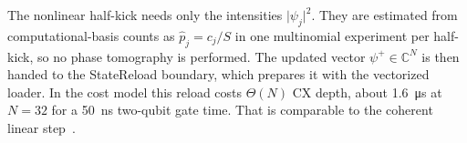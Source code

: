 The nonlinear half-kick needs only the intensities $\lvert\psi_j\rvert^{2}$. They are estimated from computational-basis counts as $\hat p_j=c_j/S$ in one multinomial experiment per half-kick, so no phase tomography is performed. The updated vector $\psi^{+}\in\mathbb{C}^{N}$ is then handed to the StateReload boundary, which prepares it with the vectorized loader. In the cost model this reload costs $\Theta(N)$ CX depth, about \SI{1.6}{\micro\second} at $N=32$ for a \SI{50}{\nano\second} two-qubit gate time. That is comparable to the coherent linear step~\cite{guo2026nonlinearwaves}.

